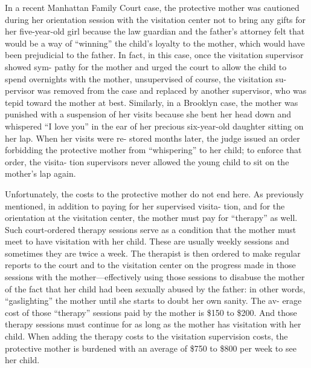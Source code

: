 In a recent Manhattan Family Court case, the protective mother was
cautioned during her orientation session with the visitation center not
to bring any gifts for her five-year-old girl because the law guardian
and the father’s attorney felt that would be a way of “winning” the
child’s loyalty to the mother, which would have been prejudicial to the
father. In fact, in this case, once the visitation supervisor showed sym-
pathy for the mother and urged the court to allow the child to spend
overnights with the mother, unsupervised of course, the visitation su-
pervisor was removed from the case and replaced by another supervisor,
who was tepid toward the mother at best. Similarly, in a Brooklyn case,
the mother was punished with a suspension of her visits because she bent
her head down and whispered “I love you” in the ear of her precious
six-year-old daughter sitting on her lap. When her visits were re-
stored months later, the judge issued an order forbidding the protective
mother from “whispering” to her child; to enforce that order, the visita-
tion supervisors never allowed the young child to sit on the mother’s lap
again.  \pfl{}


Unfortunately, the costs to the protective mother do not end here. As
previously mentioned, in addition to paying for her supervised visita-
tion, and for the orientation at the visitation center, the mother must
pay for “therapy” as well. Such court-ordered therapy sessions serve as
a condition that the mother must meet to have visitation with her child.
These are usually weekly sessions and sometimes they are twice a week.
The therapist is then ordered to make regular reports to the court and
to the visitation center on the progress made in those sessions with the
mother—effectively using those sessions to disabuse the mother of the
fact that her child had been sexually abused by the father: in other words,
“gaslighting” the mother until she starts to doubt her own sanity. The av-
erage cost of those “therapy” sessions paid by the mother is \$150 to \$200.
And those therapy sessions must continue for as long as the mother has
visitation with her child. When adding the therapy costs to the visitation
supervision costs, the protective mother is burdened with an average of
\$750 to \$800 per week to see her child. \pfl{}




